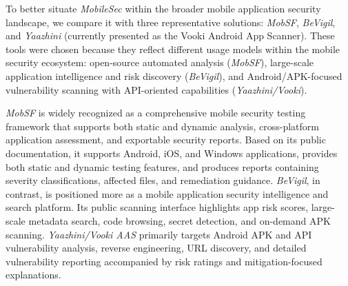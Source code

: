 \documentclass[preprint,12pt, a4paper]{elsarticle}
\begin{document}
To better situate \textit{MobileSec} within the broader mobile application security landscape, we compare it with three representative solutions: \textit{MobSF}, \textit{BeVigil}, and \textit{Yaazhini} (currently presented as the Vooki Android App Scanner). These tools were chosen because they reflect different usage models within the mobile security ecosystem: open-source automated analysis (\textit{MobSF}), large-scale application intelligence and risk discovery (\textit{BeVigil}), and Android/APK-focused vulnerability scanning with API-oriented capabilities (\textit{Yaazhini/Vooki}).

\textit{MobSF} is widely recognized as a comprehensive mobile security testing framework that supports both static and dynamic analysis, cross-platform application assessment, and exportable security reports. Based on its public documentation, it supports Android, iOS, and Windows applications, provides both static and dynamic testing features, and produces reports containing severity classifications, affected files, and remediation guidance. \textit{BeVigil}, in contrast, is positioned more as a mobile application security intelligence and search platform. Its public scanning interface highlights app risk scores, large-scale metadata search, code browsing, secret detection, and on-demand APK scanning. \textit{Yaazhini/Vooki AAS} primarily targets Android APK and API vulnerability analysis, reverse engineering, URL discovery, and detailed vulnerability reporting accompanied by risk ratings and mitigation-focused explanations.
\end{document}
